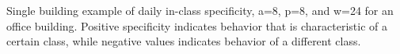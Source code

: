Single building example of daily in-class specificity, a=8, p=8, and w=24 for an office building. Positive specificity indicates behavior that is characteristic of a certain class, while negative values indicates behavior of a different class.
\label{fig:dailyspecificity_single}